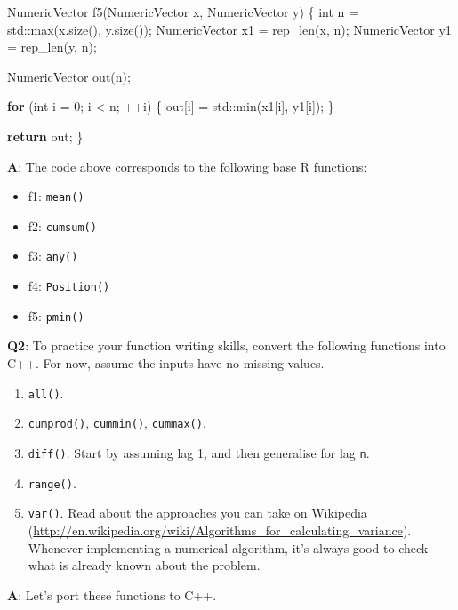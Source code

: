 \documentclass[
]{krantz}
\makeatletter
\newenvironment{Shaded}{\begin{snugshade}}{\end{snugshade}}
\newcommand{\BuiltInTok}[1]{#1}
\newcommand{\ControlFlowTok}[1]{\textcolor[rgb]{0.13,0.29,0.53}{\textbf{#1}}}
\newcommand{\DataTypeTok}[1]{\textcolor[rgb]{0.13,0.29,0.53}{#1}}
\newcommand{\DecValTok}[1]{\textcolor[rgb]{0.00,0.00,0.81}{#1}}
\newcommand{\NormalTok}[1]{#1}
\providecommand{\tightlist}{%
  \setlength{\itemsep}{0pt}\setlength{\parskip}{0pt}}
\renewcommand{\href}[2]{#2 (\url{#1})}
\newenvironment{kframe}{%
\medskip{}
\setlength{\fboxsep}{.8em}
 \def\at@end@of@kframe{}%
 \ifinner\ifhmode%
  \def\at@end@of@kframe{\end{minipage}}%
  \begin{minipage}{\columnwidth}%
 \fi\fi%
 \def\FrameCommand##1{\hskip\@totalleftmargin \hskip-\fboxsep
 \colorbox{shadecolor}{##1}\hskip-\fboxsep
     \hskip-\linewidth \hskip-\@totalleftmargin \hskip\columnwidth}%
 \MakeFramed {\advance\hsize-\width
   \@totalleftmargin\z@ \linewidth\hsize
   \@setminipage}}%
 {\par\unskip\endMakeFramed%
 \at@end@of@kframe}
\renewenvironment{Shaded}{\begin{kframe}}{\end{kframe}}
\renewcommand{\DataTypeTok}[1]{\textcolor[rgb]{0.56,0.13,0.00}{{#1}}}
\renewcommand{\DecValTok}  [1]{\textcolor[rgb]{0.25,0.63,0.44}{{#1}}}
\renewcommand{\NormalTok}  [1]{{#1}}
\makeatother
\begin{document}
\begin{Shaded}
\begin{Highlighting}[]
\NormalTok{NumericVector f5(NumericVector x, NumericVector y) \{}
  \DataTypeTok{int}\NormalTok{ n = }\BuiltInTok{std::}\NormalTok{max(x.size(), y.size());}
\NormalTok{  NumericVector x1 = rep_len(x, n);}
\NormalTok{  NumericVector y1 = rep_len(y, n);}
  
\NormalTok{  NumericVector out(n);}
  
  \ControlFlowTok{for}\NormalTok{ (}\DataTypeTok{int}\NormalTok{ i = }\DecValTok{0}\NormalTok{; i < n; ++i) \{}
\NormalTok{    out[i] = }\BuiltInTok{std::}\NormalTok{min(x1[i], y1[i]);}
\NormalTok{  \}}
  
  \ControlFlowTok{return}\NormalTok{ out;}
\NormalTok{\}}
\end{Highlighting}
\end{Shaded}

\textbf{{A}}: The code above corresponds to the following base R functions:

\begin{itemize}
\tightlist
\item
  f1: \texttt{mean()}\\
\item
  f2: \texttt{cumsum()}\\
\item
  f3: \texttt{any()}
\item
  f4: \texttt{Position()}
\item
  f5: \texttt{pmin()}
\end{itemize}

\textbf{{Q2}}: To practice your function writing skills, convert the following functions into C++. For now, assume the inputs have no missing values.

\begin{enumerate}
\def\labelenumi{\arabic{enumi}.}
\item
  \texttt{all()}.
\item
  \texttt{cumprod()}, \texttt{cummin()}, \texttt{cummax()}.
\item
  \texttt{diff()}. Start by assuming lag 1, and then generalise for lag \texttt{n}.
\item
  \texttt{range()}.
\item
  \texttt{var()}. Read about the approaches you can take on \href{http://en.wikipedia.org/wiki/Algorithms_for_calculating_variance}{Wikipedia}. Whenever implementing a numerical algorithm, it's always good to check what is already known about the problem.
\end{enumerate}

\textbf{{A}}: Let's port these functions to C++.
\end{document}
